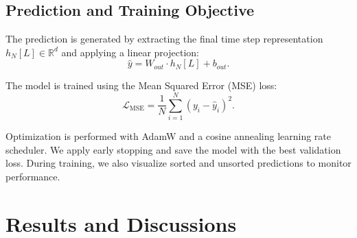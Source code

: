 \documentclass[conference]{IEEEtran}
\begin{document}
\subsection{Prediction and Training Objective}

The prediction is generated by extracting the final time step representation $h_N[L] \in \mathbb{R}^d$ and applying a linear projection:
\begin{equation}
\hat{y} = W_{out} \cdot h_N[L] + b_{out}.
\end{equation}

The model is trained using the Mean Squared Error (MSE) loss:
\begin{equation}
\mathcal{L}_{\text{MSE}} = \frac{1}{N} \sum_{i=1}^N (y_i - \hat{y}_i)^2.
\end{equation}

Optimization is performed with AdamW and a cosine annealing learning rate scheduler. We apply early stopping and save the model with the best validation loss. During training, we also visualize sorted and unsorted predictions to monitor performance.






\section{Results and Discussions}
\end{document}
